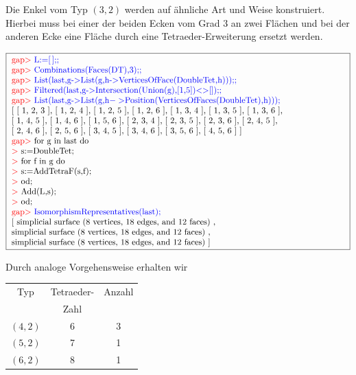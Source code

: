 \documentclass[12pt,titlepage,twoside,cleardoublepage]{article}
\theoremstyle{nummermitklammern}
\numberwithin{equation}{section}
\begin{document}
 Die Enkel vom Typ $(3,2)$ werden auf ähnliche Art und Weise konstruiert. Hierbei muss bei einer der beiden Ecken vom Grad 3 an zwei Flächen und bei der anderen Ecke eine Fläche durch eine Tetraeder-Erweiterung ersetzt werden.
 \begin{center}
 $\fbox{
\parbox{14cm}{
\textcolor{red}{gap$>$} \textcolor{blue}{L:=[\,];;}\newline
\textcolor{red}{gap$>$} \textcolor{blue}{Combinations(Faces(DT),3);;}\newline
\textcolor{red}{gap$>$} \textcolor{blue}{List(last,g-$>$List(g,h-$>$VerticesOfFace(DoubleTet,h)));;}\newline
\textcolor{red}{gap$>$} \textcolor{blue}{Filtered(last,g-$>$Intersection(Union(g),[1,5])$<>$[]);;}\newline
\textcolor{red}{gap$>$} \textcolor{blue}{List(last,g-$>$List(g,h$->$Position(VerticesOfFaces(DoubleTet),h)));}\newline
[ [ 1, 2, 3 ], [ 1, 2, 4 ], [ 1, 2, 5 ], [ 1, 2, 6 ], [ 1, 3, 4 ],
  [ 1, 3, 5 ], [ 1, 3, 6 ], \newline
  [ 1, 4, 5 ], [ 1, 4, 6 ], [ 1, 5, 6 ],
  [ 2, 3, 4 ], [ 2, 3, 5 ], [ 2, 3, 6 ], [ 2, 4, 5 ], 
 \newline
  [ 2, 4, 6 ], [ 2, 5, 6 ], [ 3, 4, 5 ], [ 3, 4, 6 ], [ 3, 5, 6 ], [ 4, 5, 6 ] ]\newline
\textcolor{red}{gap$>$} for g in last do\newline
\textcolor{red}{$>$} s:=DoubleTet;\newline
\textcolor{red}{$>$} for f in g do\newline
\textcolor{red}{$>$} s:=AddTetraF(s,f);\newline
\textcolor{red}{$>$} od;\newline
\textcolor{red}{$>$} Add(L,s);\newline
\textcolor{red}{$>$} od;\newline
\textcolor{red}{gap$>$} \textcolor{blue}{IsomorphismRepresentatives(last);}\newline
[ simplicial surface (8 vertices, 18 edges, and 12 faces)
    ,\newline
     simplicial surface (8 vertices, 18 edges, and 12 faces)
    ,\newline
  simplicial surface (8 vertices, 18 edges, and 12 faces)
 ]
}}$ 
\end{center}  
Durch analoge Vorgehensweise erhalten wir
\begin{center}
\begin{tabular}{|c|c|c|}
\hline
 Typ&Tetraeder-  & Anzahl\\
&Zahl &\\
\hline
$(4,2)$&6& 3\\
\hline
$(5,2)$&7& 1\\
\hline
$(6,2)$&8& 1\\
\hline
\end{tabular}
\end{center}
\end{document}
